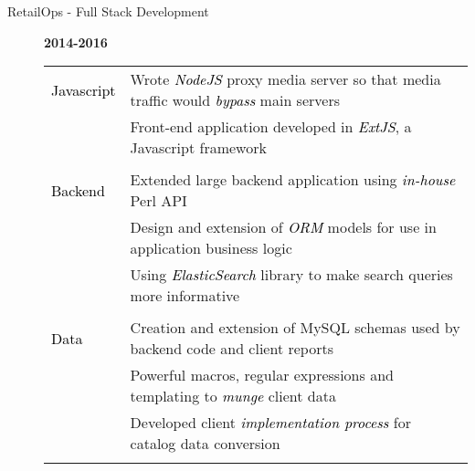 \documentclass[12pt]{article}
\begin{document}
\begin{description}
\begin{description}
                \item[RetailOps - Full Stack Development] \hfill \textbf{2014-2016}\\
		\textcolor{gray}{
                    \begin{tabular}{l|l}
				\\[-1.0mm]
                        \textcolor{black}{Javascript} & Wrote \textcolor{black}{\textit{NodeJS}} proxy media server so that media traffic would \textcolor{black}{\textit{bypass}} main servers \\
				   & Front-end application developed in \textcolor{black}{\textit{ExtJS}}, a Javascript framework\\
				\\[-1.7mm]
                        \textcolor{black}{Backend}    & Extended large backend application using \textcolor{black}{\textit{in-house}} Perl API \\
                                   & Design and extension of \textcolor{black}{\textit{ORM}} models for use in application business logic \\
                                   & Using \textcolor{black}{\textit{ElasticSearch}} library to make search queries more informative\\
				\\[-1.7mm]
                        \textcolor{black}{Data}       & Creation and extension of MySQL schemas used by backend code and client reports\\
				   & Powerful macros, regular expressions and templating to \textcolor{black}{\textit{munge}} client data\\
				   & Developed client \textcolor{black}{\textit{implementation process}} for catalog data conversion\\
				\\[-1.0mm]
                    \end{tabular}
		}
            \end{description}


\end{description}
\end{document}
